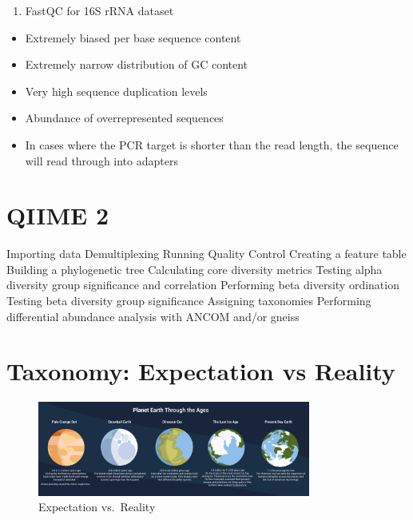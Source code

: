 \documentclass[
]{book}
\providecommand{\tightlist}{%
  \setlength{\itemsep}{0pt}\setlength{\parskip}{0pt}}
\begin{document}
\begin{enumerate}
\def\labelenumi{\arabic{enumi}.}
\setcounter{enumi}{2}
\tightlist
\item
  FastQC for 16S rRNA dataset
\end{enumerate}

\begin{itemize}
\tightlist
\item
  Extremely biased per base sequence content
\item
  Extremely narrow distribution of GC content
\item
  Very high sequence duplication levels
\item
  Abundance of overrepresented sequences
\item
  In cases where the PCR target is shorter than the read length, the sequence will read through into adapters
\end{itemize}

\hypertarget{qiime-2}{%
\section{QIIME 2}\label{qiime-2}}

Importing data
Demultiplexing
Running Quality Control
Creating a feature table
Building a phylogenetic tree
Calculating core diversity metrics
Testing alpha diversity group significance and correlation
Performing beta diversity ordination
Testing beta diversity group significance
Assigning taxonomies
Performing differential abundance analysis with ANCOM and/or gneiss

\hypertarget{taxonomy-expectation-vs-reality}{%
\section{Taxonomy: Expectation vs Reality}\label{taxonomy-expectation-vs-reality}}

\begin{figure}
\centering
\includegraphics[width=0.8\textwidth,height=\textheight]{./Figures/Planets.png}
\caption{Expectation vs.~Reality}
\end{figure}
\end{document}

